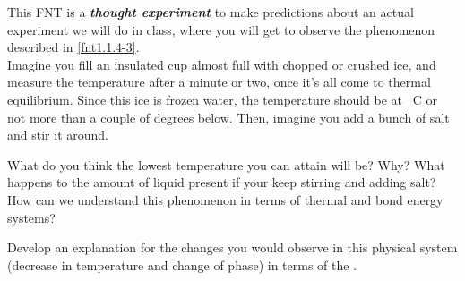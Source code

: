 \label{fnt1.1.4-4}


This FNT is a \textbf{\emph{thought experiment}} to make predictions about an actual experiment we will do in class, where you will get to observe the phenomenon described in \ref{fnt1.1.4-3}.\\

Imagine you fill an insulated cup almost full with chopped or crushed ice, and measure the temperature after a minute or two, once it's all come to thermal equilibrium. Since this ice is frozen water, the temperature should be at \unit[0]{\textdegree C} or not more than a couple of degrees below. Then, imagine you add a bunch of salt and stir it around. 

What do you think the lowest temperature you can attain will be? Why? What happens to the amount of liquid present if your keep stirring and adding salt? How can we understand this phenomenon in terms of thermal and bond energy systems?

Develop an explanation for the changes you would observe in this physical system (decrease in temperature and change of phase) in terms of the \EnergyInteractionModel{}.
